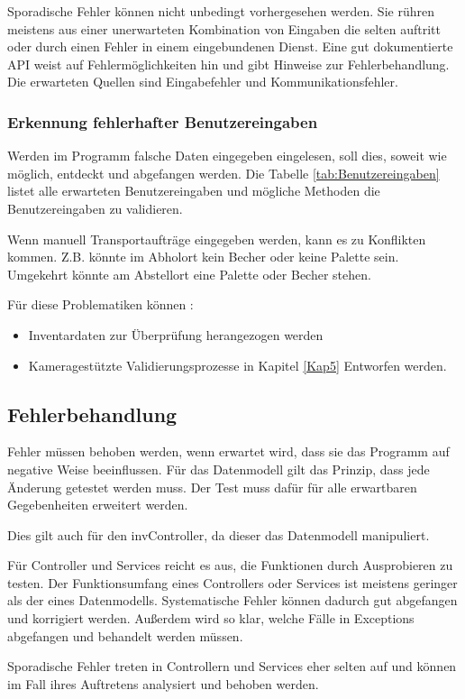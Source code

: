 Sporadische Fehler können nicht unbedingt vorhergesehen werden. 
Sie rühren meistens aus einer unerwarteten Kombination von Eingaben die selten auftritt oder durch einen Fehler in einem eingebundenen Dienst. 
Eine gut dokumentierte API weist auf Fehlermöglichkeiten hin und gibt Hinweise zur Fehlerbehandlung.
Die erwarteten Quellen sind Eingabefehler und Kommunikationsfehler.


\subsubsection{Erkennung fehlerhafter Benutzereingaben}

Werden im Programm falsche Daten eingegeben eingelesen, soll dies, soweit wie möglich, entdeckt und abgefangen werden.
Die Tabelle \ref{tab:Benutzereingaben} listet alle erwarteten Benutzereingaben und mögliche Methoden die Benutzereingaben
zu validieren.



Wenn manuell Transportaufträge eingegeben werden, kann es zu Konflikten kommen.
Z.B. könnte im Abholort kein Becher oder keine Palette sein.
Umgekehrt könnte am Abstellort eine Palette oder Becher stehen.

Für diese Problematiken können :
\begin{itemize}
    \item Inventardaten zur Überprüfung herangezogen werden
    \item Kameragestützte Validierungsprozesse in Kapitel \ref{Kap5} Entworfen werden.
\end{itemize}

\subsection{Fehlerbehandlung}

Fehler müssen behoben werden, wenn erwartet wird, dass sie das Programm auf negative Weise beeinflussen.
Für das Datenmodell gilt das Prinzip, dass jede Änderung getestet werden muss. 
Der Test muss dafür für alle erwartbaren Gegebenheiten erweitert werden. 

Dies gilt auch für den invController, da dieser das Datenmodell manipuliert.

Für Controller und Services reicht es aus, die Funktionen durch Ausprobieren zu testen. 
Der Funktionsumfang eines Controllers oder Services ist meistens geringer als der eines Datenmodells.
Systematische Fehler können dadurch gut abgefangen und korrigiert werden. 
Außerdem wird so klar, welche Fälle in Exceptions abgefangen und behandelt werden müssen. 

Sporadische Fehler treten in Controllern und Services eher selten auf und können im Fall ihres Auftretens analysiert und behoben werden. 

